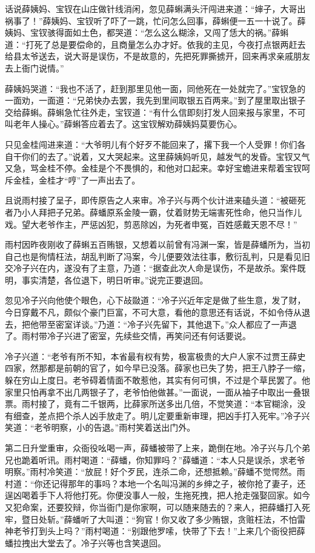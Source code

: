 \documentclass[12pt,oneside]{book}
\begin{document}
话说薛姨妈、宝钗在山庄做针线消闲，忽见薛蝌满头汗闯进来道：“婶子，大哥出祸事了！”薛姨妈、宝钗听了吓了一跳，忙问怎么回事，薛蝌便一五一十说了。薛姨妈、宝钗骇得面如土色，都哭道：“怎么这么糊涂，又闯了恁大的祸。”薛蝌道：“打死了总是要偿命的，且商量怎么办才好。依我的主见，今夜打点银两赶去给县太爷送去，说大哥是误伤，不是故意的，先把死罪撕掳开，回来再求亲戚朋友去上衙门说情。”

薛姨妈哭道：“我也不活了，赶到那里见他一面，同他死在一处就完了。”宝钗急的一面劝，一面道：“兄弟快办去罢，我先到里间取银五百两来。”到了屋里取出银子交给薛蝌。薛蝌急忙往外走，宝钗道：“有什么信即刻打发人回来报与家里，不可叫老年人操心。”薛蝌答应着去了。这宝钗解劝薛姨妈莫要伤心。

只见金桂闯进来道：“大爷明儿有个好歹不能回来了，撂下我一个人受罪！你们各自干你们的去了。”说着，又大哭起来。这里薛姨妈听见，越发气的发昏。宝钗又气又急，骂金桂不停。金桂是个不畏惧的，和他对口起来。幸好宝蟾进来帮着宝钗呵斥金桂，金桂才“哼”了一声出去了。

且说雨村接了呈子，即传原告之人来审。冷子兴与两个伙计进来磕头道：“被砸死者乃小人拜把子兄弟。薛蟠原系金陵一霸，仗着财势无端害死性命，他只当作儿戏。望大老爷作主，严惩凶犯，剪恶除凶，为死者申冤，百姓感戴天恩不尽！”

雨村因昨夜刚收了薛蝌五百贿银，又想着以前曾有冯渊一案，皆是薛蟠所为，当初自己也是徇情枉法，胡乱判断了冯案，今儿便要效法往事，敷衍乱判，只是看见旧交冷子兴在内，遂没有了主意，乃道：“据查此次人命是误伤，不是故杀。案件既明，事实清楚，各位退下，明日听审。”说完正要退回。

忽见冷子兴向他使个眼色，心下敁敠道：“冷子兴近年定是做了些生意，发了财，今日穿戴不凡，颇似个豪门巨富，不可大意，看他的意思还有话说，不如令侍从退去，把他带至密室详谈。”乃道：“冷子兴先留下，其他退下。”众人都应了一声退了。雨村带冷子兴进了密室，先续些交情，再笑问还有何话要说。

冷子兴道：“老爷有所不知，本省最有权有势，极富极贵的大户人家不过贾王薛史四家，然那都是前朝的官了，如今早已没落。薛家也已失了势，把王八脖子一缩，躲在穷山上度日。老爷碍着情面不敢惹他，其实有何可惧，不过是个草民罢了。他家里只怕再拿不出几两银子了，老爷怕他做甚。”一面说，一面从袖子中取出一叠银票。雨村接了，竟有二千银两，比薛家所送多出几倍，不觉笑道：“本官糊涂，没有细查，差点把个杀人凶手放走了。明儿定要重新审理，把凶手打入死牢。”冷子兴笑道：“老爷明察，小的告退。”雨村笑着送出门外。

第二日升堂重审，众衙役吆喝一声，薛蟠被带了上来，跪倒在地。冷子兴与几个弟兄也跪着听讯。雨村喝道：“薛蟠，你知罪吗？”薛蟠道：“本人只是误杀，求老爷明察。”雨村冷笑道：“放屁！好个歹民，连杀二命，还想抵赖。”薛蟠不觉愕然。雨村道：“你还记得那年的事吗？本地一个名叫冯渊的乡绅之子，被你抢了妻子，还逞凶喝着手下人将他打死。你便没事人一般，生拖死拽，把人抢走强娶回家。如今又犯命案，还要狡辩，你当衙门是你家啊，可以随来随去的？来人，把薛蟠打入死牢，暨日处斩。”薛蟠听了大叫道：“狗官！你又收了多少贿银，贪赃枉法，不怕雷神老爷打到头上吗？”雨村喝道：“别跟他罗嗦，快带了下去！”上来几个衙役把薛蟠拉拽出大堂去了。冷子兴等也含笑退回。
\end{document}
